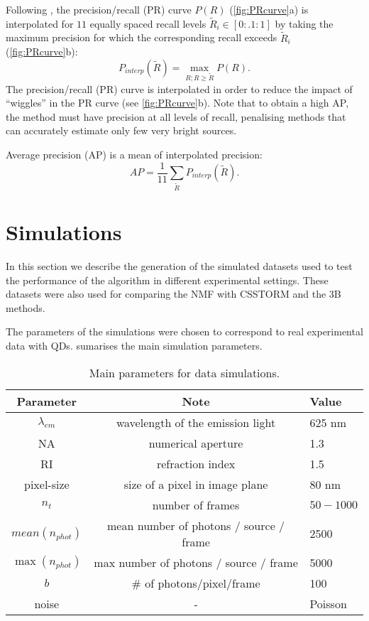 Following \cite{Everingham2009}, the precision/recall (PR) curve $P(R)$ (\autoref{fig:PRcurve}a) is interpolated for $11$ equally spaced recall levels $\tilde{R}_{i}\in[0:.1:1]$ by taking the maximum precision for which the corresponding recall exceeds $\tilde{R}_{i}$ (\autoref{fig:PRcurve}b):
%
\begin{equation}
	P_{interp}(\tilde{R})=\max_{R;R\geq \tilde{R}}P(R).
\end{equation}
%
The precision/recall (PR) curve is interpolated in order to reduce the impact of ``wiggles'' in the PR curve (see \autoref{fig:PRcurve}b). Note that to obtain a high AP, the method must have precision at all levels of recall, penalising methods that can accurately estimate only few very bright sources. 

Average precision (AP) is a mean of interpolated precision:
%
\begin{equation}
	AP=\frac{1}{11}\sum_{\tilde{R}}{P_{interp}(\tilde{R})}.
	\label{eq:AP}
\end{equation}


\clearpage
\section{Simulations \label{sec:simulations}}
In this section we describe the generation of the simulated datasets used to test the performance of the algorithm in different experimental settings. These datasets were also used for comparing the NMF with CSSTORM \cite{Zhu2012} and the 3B \cite{Cox2011} methods. 


The parameters of the simulations were chosen to correspond to real experimental data with QDs.   sumarises the main simulation parameters. 
%
\begin{table}[!h]
	\centering
	\begin{tabular}{|c|c|l|}
		\hline 
		Parameter 		& Note  							& Value\tabularnewline
		\hline \hline 
		$\lambda_{em}$ 	& wavelength of the emission light 	& 625 nm\tabularnewline
		\hline 
		NA 				& numerical aperture 				& 1.3\tabularnewline
		\hline 
		RI 				& refraction index 					& 1.5\tabularnewline
		\hline 
		pixel-size 		& size of a pixel in image plane	& 80 nm\tabularnewline
		\hline 
		$n_{t}$ 			& number of frames  					& $50-1000$\tabularnewline
		\hline 
		$\unit{mean}(n_{phot})$ & mean number of photons / source / frame 	& 2500\tabularnewline
		\hline 
		$\max(n_{phot})$ & max number of photons / source / frame 	& 5000\tabularnewline
		\hline 
		$b$ 				& \# of photons/pixel/frame 			& 100\tabularnewline
		\hline
		noise			& 		-						& Poisson\tabularnewline
		\hline
	\end{tabular}
	\caption{Main parameters for data simulations.}
	\label{tab:Simulations parameters}
\end{table}

